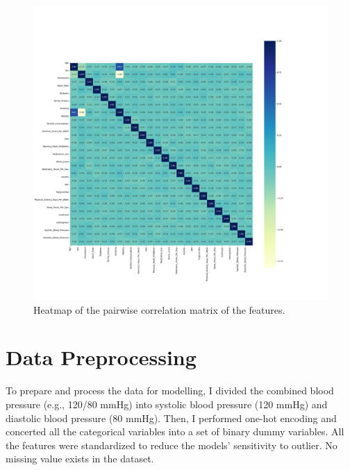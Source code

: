 \documentclass{article}
\begin{document}
\begin{figure}
\centering
\includegraphics[width=1.3\linewidth]{figures/correlation_heatmap.png}
\caption{\label{fig:correlation_heatmap} Heatmap of the pairwise correlation matrix of the features.}
\end{figure}

\section{Data Preprocessing}
To prepare and process the data for modelling, I divided the combined blood pressure (e.g., 120/80 mmHg) into systolic blood pressure (120 mmHg) and diastolic blood pressure (80 mmHg). Then, I performed one-hot encoding and concerted all the categorical variables into a set of binary dummy variables.  All the features were standardized to reduce the models’ sensitivity to outlier. No missing value exists in the dataset.
\end{document}
